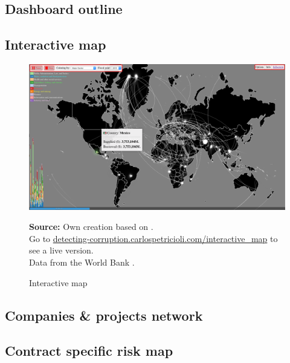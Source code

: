 \subsection{Dashboard outline}

\subsection{Interactive map}

\begin{figure}[H]
\begin{center}
\caption{Interactive map}
\label{fig_interactive_map}
\includegraphics[width=\textwidth,height=1\textheight,keepaspectratio]{../img/interactive_map_mex.pdf}
\end{center}
\noindent \footnotesize{\textbf{Source:} Own creation based on \cite{wb_i_map}. \\Go to \href{http://detecting-corruption.carlospetricioli.com/interactive_map}{detecting-corruption.carlospetricioli.com/interactive\_map} to see a live version. \\Data from the World Bank \parencite{wb_data}.}
\end{figure}

\subsection{Companies \& projects network}

\subsection{Contract specific risk map}

